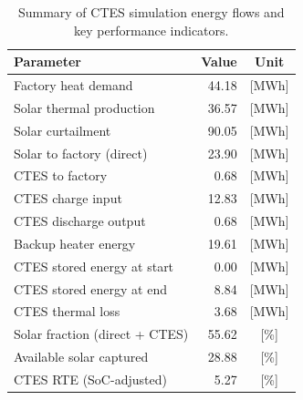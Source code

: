 \renewcommand{\arraystretch}{1.2}
\begin{table}[h]
\centering
\begin{tabular}{l|r c}
\hline
Parameter & Value & Unit \\
\hline
Factory heat demand & 44.18 & [MWh] \\
Solar thermal production & 36.57 & [MWh] \\
Solar curtailment & 90.05 & [MWh] \\
Solar to factory (direct) & 23.90 & [MWh] \\
CTES to factory & 0.68 & [MWh] \\
CTES charge input & 12.83 & [MWh] \\
CTES discharge output & 0.68 & [MWh] \\
Backup heater energy & 19.61 & [MWh] \\
CTES stored energy at start & 0.00 & [MWh] \\
CTES stored energy at end & 8.84 & [MWh] \\
CTES thermal loss & 3.68 & [MWh] \\
\hline
Solar fraction (direct + CTES) & 55.62 & [\%] \\
Available solar captured & 28.88 & [\%] \\
CTES RTE (SoC-adjusted) & 5.27 & [\%] \\
\hline
\end{tabular}
\caption{Summary of CTES simulation energy flows and key performance indicators.}
\label{tab:ctes-simulation-summary}
\end{table}
